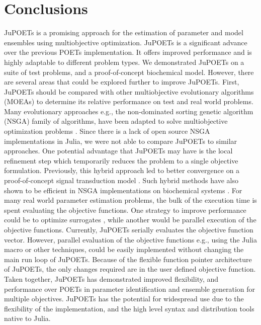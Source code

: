 \documentclass{bmcart}
\begin{document}
\section*{Conclusions}
JuPOETs is a promising approach for the estimation of parameter and model ensembles using multiobjective optimization.
JuPOETs is a significant advance over the previous POETs implementation.
It offers improved performance and is highly adaptable to different problem types.
We demonstrated JuPOETs on a suite of test problems, and a proof-of-concept biochemical model.
However, there are several areas that could be explored further to improve JuPOETs.
First, JuPOETs should be compared with other multiobjective evolutionary algorithms (MOEAs) to determine its relative performance on test and real world problems.
Many evolutionary approaches e.g., the non-dominated sorting genetic algorithm (NSGA) family of algorithms, have been adapted to solve multiobjective optimization problems \cite{DEB2002,HUBAND2006}.
Since there is a lack of open source NSGA implementations in Julia, we were not able to compare JuPOETs to similar approaches.
One potential advantage that JuPOETs may have is the local refinement step which temporarily reduces the problem to a single objective formulation.
Previously, this hybrid approach led to better convergence on a proof-of-concept signal transduction model \cite{Song:2010aa}.
Such hybrid methods have also shown to be efficient in NSGA implementations on biochemical systems \cite{Otero-Muras2014,Sendin2006}.
For many real world parameter estimation problems, the bulk of the execution time is spent evaluating the objective functions.
One strategy to improve performance could be to optimize surrogates \cite{SURROGATES}, while another would be parallel execution of the objective functions.
Currently, JuPOETs serially evaluates the objective function vector.
However, parallel evaluation of the objective functions e.g., using the \texttt{\@parallel} Julia macro or other techniques,
could be easily implemented without changing the main run loop of JuPOETs.
Because of the flexible function pointer architecture of JuPOETs, the only changes required are in the user defined objective function.
Taken together, JuPOETs has demonstrated improved flexibility, and performance over POETs in parameter identification and ensemble generation for multiple objectives.
JuPOETs has the potential for widespread use due to the flexibility of the implementation, and the high level syntax and distribution tools native to Julia.

\end{document}
